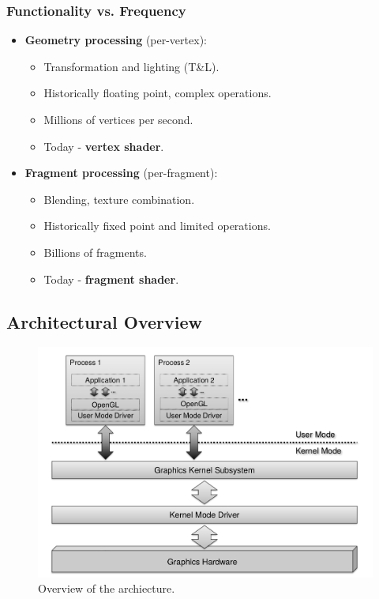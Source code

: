 \documentclass[11pt]{article}
\begin{document}
\subsubsection{Functionality vs. Frequency}
\begin{itemize}
  \item \textbf{Geometry processing} (per-vertex):
    \begin{itemize}
      \item Transformation and lighting (T\&L).
      \item Historically floating point, complex operations.
      \item Millions of vertices per second.
      \item Today - \textbf{vertex shader}.
    \end{itemize}
  \item \textbf{Fragment processing} (per-fragment):
    \begin{itemize}
      \item Blending, texture combination.
      \item Historically fixed point and limited operations.
      \item Billions of fragments.
      \item Today - \textbf{fragment shader}.
    \end{itemize}
\end{itemize}

\subsection{Architectural Overview}
\begin{figure}[htb!]
  \centering
  \caption{Overview of the archiecture.}
  \includegraphics[scale=0.3]{architecture}
\end{figure}
\end{document}
